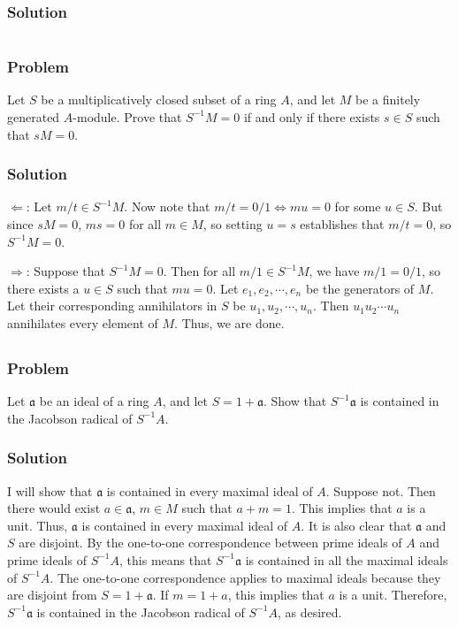 \documentclass[book,12pt,oneside,openany]{memoir}
\begin{document}
\subsection{Solution}


\chapter{}

\section{}
\subsection{Problem}
Let $S$ be a multiplicatively closed subset of a ring $A$, and let $M$ be a finitely generated $A$-module. Prove that $S^{-1}M = 0$ if and only if there exists $s \in S$ such that $sM = 0$.

\subsection{Solution}
$\Leftarrow$: Let $m/t \in S^{-1}M$. Now note that $m/t  = 0/1 \Leftrightarrow mu = 0$ for some $u \in S$. But since $sM = 0$, $ms = 0$ for all $m \in M$, so setting $u = s$ establishes that $m/t = 0$, so $S^{-1}M = 0$.

$\Rightarrow$: Suppose that $S^{-1}M = 0$. Then for all $m/1 \in S^{-1}M$, we have $m/1 = 0/1$, so there exists a $u \in S$ such that $mu = 0$. Let $e_1, e_2, \cdots, e_n$ be the generators of $M$. Let their corresponding annihilators in $S$ be $u_1, u_2, \cdots, u_n$. Then $u_1 u_2 \cdots u_n$ annihilates every element of $M$. Thus, we are done.

\section{}
\subsection{Problem}
Let $\mathfrak{a}$ be an ideal of a ring $A$, and let $S = 1 + \mathfrak{a}$. Show that $S^{-1}\mathfrak{a}$ is contained in the Jacobson radical of $S^{-1}A$. 

\subsection{Solution}
I will show that $\mathfrak{a}$ is contained in every maximal ideal of $A$. Suppose not. Then there would exist $a \in \mathfrak{a}$, $m \in M$ such that $a + m = 1$. This implies that $a$ is a unit. Thus, $\mathfrak{a}$ is contained in every maximal ideal of $A$. It is also clear that $\mathfrak{a}$ and $S$ are disjoint. By the one-to-one correspondence between prime ideals of $A$ and prime ideals of $S^{-1}A$, this means that $S^{-1}\mathfrak{a}$ is contained in all the maximal ideals of $S^{-1}A$. The one-to-one correspondence applies to maximal ideals because they are disjoint from $S = 1 + \mathfrak{a}$. If $m = 1 + a$, this implies that $a$ is a unit. Therefore, $S^{-1}\mathfrak{a}$ is contained in the Jacobson radical of $S^{-1}A$, as desired.
\end{document}
